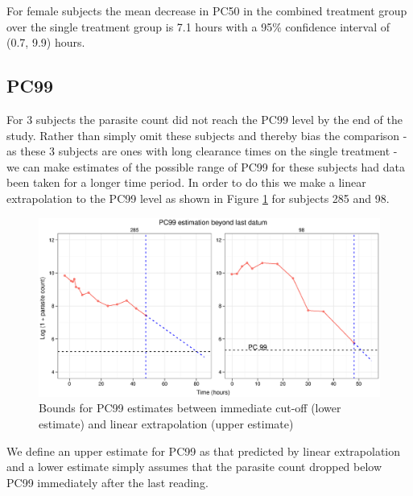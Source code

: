 For female subjects the mean decrease in PC50 in the combined treatment group over the single treatment group is 7.1 hours with a 95\% confidence interval of (0.7, 9.9) hours.

\subsection{PC99}
For 3 subjects the parasite count did not reach the PC99 level by the end of the study. Rather than simply omit these subjects and thereby bias the comparison - as these 3 subjects are ones with long clearance times on the single treatment - we can make estimates of the possible range of PC99 for these subjects had data been taken for a longer time period. In order to do this we make a linear extrapolation to the PC99 level as shown in Figure \ref{pc99extrap} for subjects 285 and 98.
\begin{figure}[h]
\includegraphics[width=150mm]{pc99extrap.eps} 
\caption{Bounds for PC99 estimates between immediate cut-off (lower estimate) and linear extrapolation (upper estimate)}
\label{pc99extrap}
\end{figure}
We define an upper estimate for PC99 as that predicted by linear extrapolation and a lower estimate simply assumes that the parasite count dropped below PC99 immediately after the last reading.

